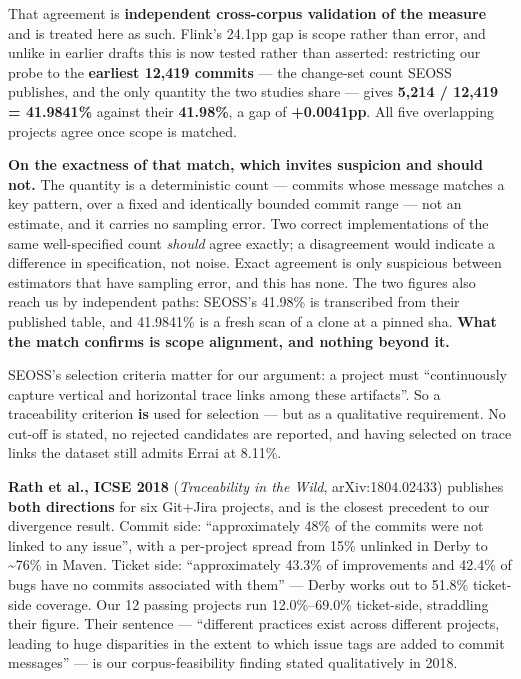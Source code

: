 \documentclass[11pt,a4paper]{article}
\begin{document}
That agreement is \textbf{independent cross-corpus validation of the measure} and is treated here as such. Flink's 24.1pp gap is scope rather than error, and unlike in earlier drafts this is now tested rather than asserted: restricting our probe to the \textbf{earliest 12,419 commits} --- the change-set count SEOSS publishes, and the only quantity the two studies share --- gives \textbf{5,214 / 12,419 = 41.9841\%} against their \textbf{41.98\%}, a gap of \textbf{+0.0041pp}. All five overlapping projects agree once scope is matched.

\textbf{On the exactness of that match, which invites suspicion and should not.} The quantity is a deterministic count --- commits whose message matches a key pattern, over a fixed and identically bounded commit range --- not an estimate, and it carries no sampling error. Two correct implementations of the same well-specified count \emph{should} agree exactly; a disagreement would indicate a difference in specification, not noise. Exact agreement is only suspicious between estimators that have sampling error, and this has none. The two figures also reach us by independent paths: SEOSS's 41.98\% is transcribed from their published table, and 41.9841\% is a fresh scan of a clone at a pinned sha. \textbf{What the match confirms is scope alignment, and nothing beyond it.}

SEOSS's selection criteria matter for our argument: a project must ``continuously capture vertical and horizontal trace links among these artifacts''. So a traceability criterion \textbf{is} used for selection --- but as a qualitative requirement. No cut-off is stated, no rejected candidates are reported, and having selected on trace links the dataset still admits Errai at 8.11\%.

\textbf{Rath et al., ICSE 2018} \cite{rath2018traceability} (\emph{Traceability in the Wild}, arXiv:1804.02433) publishes \textbf{both directions} for six Git+Jira projects, and is the closest precedent to our divergence result. Commit side: ``approximately 48\% of the commits were not linked to any issue'', with a per-project spread from 15\% unlinked in Derby to \textasciitilde{}76\% in Maven. Ticket side: ``approximately 43.3\% of improvements and 42.4\% of bugs have no commits associated with them'' --- Derby works out to 51.8\% ticket-side coverage. Our 12 passing projects run 12.0\%--69.0\% ticket-side, straddling their figure. Their sentence --- ``different practices exist across different projects, leading to huge disparities in the extent to which issue tags are added to commit messages'' --- is our corpus-feasibility finding stated qualitatively in 2018.
\end{document}
